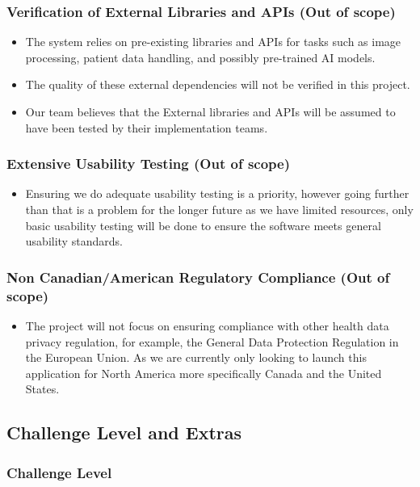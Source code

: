 \documentclass[12pt, titlepage]{article}
\begin{document}
\subsubsection{Verification of External Libraries and APIs (Out of scope)}
\begin{itemize}
    \item  The system relies on pre-existing libraries and APIs for tasks such as image processing, patient data handling, and possibly pre-trained AI models.
    \item The quality of these external dependencies will not be verified in this project.
    \item Our team believes that the External libraries and APIs will be assumed to have been tested by their implementation teams.
\end{itemize}
\subsubsection{Extensive Usability Testing (Out of scope)}
\begin{itemize}
    \item Ensuring we do adequate usability testing is a priority, however going further than that is a  problem for the longer future as we have limited resources, only basic usability testing will be done to ensure the software meets general usability standards. 
\end{itemize}
\subsubsection{Non Canadian/American Regulatory Compliance (Out of scope)}
\begin{itemize}
    \item The project will not focus on ensuring compliance with other  health data privacy regulation, for example, the General Data Protection Regulation in the European Union. As we are currently only looking to launch this application for North America more specifically Canada and the United States. 
\end{itemize}

\subsection{Challenge Level and Extras}

\subsubsection{Challenge Level}
\end{document}
